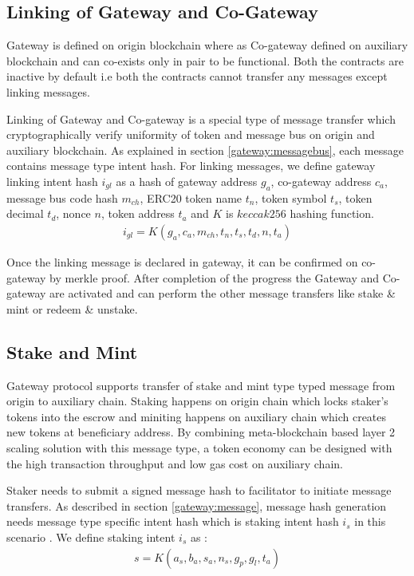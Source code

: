 \documentclass[12pt,a4paper]{article}
\begin{document}
\subsection{Linking of Gateway and Co-Gateway}\label{gateway:linking}
Gateway is defined on origin blockchain where as Co-gateway defined on auxiliary blockchain and can co-exists only in pair to be functional. 
Both the contracts are inactive by default i.e both the contracts cannot transfer any messages except linking messages.
 
 Linking of Gateway and Co-gateway is a special type of message transfer which cryptographically verify uniformity of token and message bus on origin and auxiliary blockchain. 
 As explained in section \ref{gateway:messagebus}, each message contains message type intent hash. 
 For linking messages, we define gateway linking intent hash $i_{gl}$ as a hash of gateway address $g_a$, co-gateway address $c_a$, message bus code hash $m_{ch}$, ERC20 token name $t_n$, token symbol $t_s$, token decimal $t_d$, nonce $n$, token address $t_a$ and $K$ is $keccak256$ hashing function.
 \begin{align}
i_{gl}  =K(g_a, c_a, m_{ch}, t_n, t_s, t_d, n, t_a) 	
 \end{align}

Once the linking message is declared in gateway, it can be confirmed on co-gateway by merkle proof. 
After completion of the progress the Gateway and Co-gateway are activated and can perform the other message transfers like stake \& mint or redeem \& unstake. 

\subsection{Stake and Mint}\label{gateway:stakemint}
Gateway protocol supports transfer of stake and mint type typed message from origin to auxiliary chain. 
Staking happens on origin chain which locks staker’s tokens into the escrow and miniting happens on auxiliary chain which creates new tokens at beneficiary address. 
By combining meta-blockchain based layer 2 scaling solution with this message type, a token economy can be designed with the high transaction throughput and low gas cost on auxiliary chain.

Staker needs to submit a signed message hash to facilitator to initiate message transfers. 
As described in section \ref{gateway:message}, message hash generation needs message type specific intent hash which is staking intent hash $i_s$ in this scenario . We define staking intent $i_s$  as : 
 \begin{align}
 	s = K(a_s,b_a,s_a,n_s,g_p,g_l,t_a )
 \end{align}
                                                       
\end{document}

